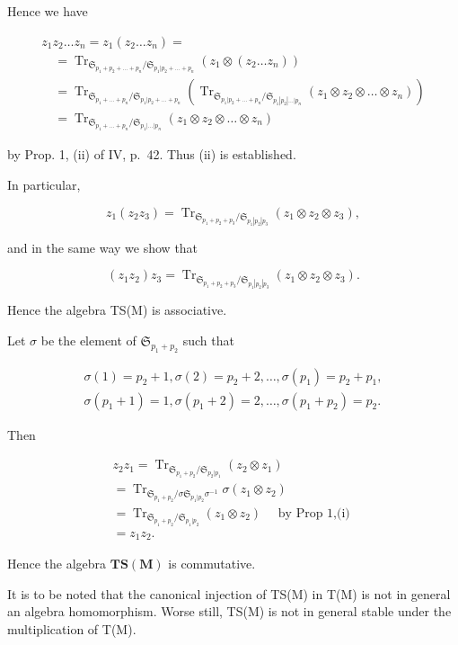 Hence we have

\[
\begin{array}{l} z _ {1} z _ {2} \dots z _ {n} = z _ {1} (z _ {2} \dots z _ {n}) = \\ \quad = \operatorname{Tr} _ {\mathfrak {S} _ {p _ {1} + p _ {2} + \dots + p _ {n}} / \mathfrak {S} _ {p _ {1} | p _ {2} + \dots + p _ {n}}} (z _ {1} \otimes (z _ {2} \dots z _ {n})) \\ \quad = \operatorname{Tr} _ {\mathfrak {S} _ {p _ {1} + \dots + p _ {n}} / \mathfrak {S} _ {p _ {1} | p _ {2} + \dots + p _ {n}}} (\operatorname{Tr} _ {\mathfrak {S} _ {p _ {1} | p _ {2} + \dots + p _ {n}} / \mathfrak {S} _ {p _ {1} | p _ {2} | \dots | p _ {n}}} (z _ {1} \otimes z _ {2} \otimes \dots \otimes z _ {n})) \\ \quad = \operatorname{Tr} _ {\mathfrak {S} _ {p _ {1} + \dots + p _ {n}} / \mathfrak {S} _ {p _ {1} | \dots | p _ {n}}} (z _ {1} \otimes z _ {2} \otimes \dots \otimes z _ {n}) \end{array}
\]

by Prop. 1, (ii) of IV, p.~42. Thus (ii) is established.

In particular,

\[
z _ {1} \left(z _ {2} z _ {3}\right) = \operatorname{Tr} _ {\mathfrak {S} _ {p _ {1} + p _ {2} + p _ {3}} / \mathfrak {S} _ {p _ {1} | p _ {2} | p _ {3}}} \left(z _ {1} \otimes z _ {2} \otimes z _ {3}\right),
\]

and in the same way we show that

\[
\left(z _ {1} z _ {2}\right) z _ {3} = \operatorname{Tr} _ {\mathfrak {S} _ {p _ {1} + p _ {2} + p _ {3}} / \mathfrak {S} _ {p _ {1} | p _ {2} | p _ {3}}} \left(z _ {1} \otimes z _ {2} \otimes z _ {3}\right).
\]

Hence the algebra TS(M) is associative.

Let \(\sigma\) be the element of \(\mathfrak{S}_{p_1 + p_2}\) such that

\[
\begin{array}{l} \sigma (1) = p _ {2} + 1, \sigma (2) = p _ {2} + 2, \dots , \sigma (p _ {1}) = p _ {2} + p _ {1}, \\ \sigma (p _ {1} + 1) = 1, \sigma (p _ {1} + 2) = 2, \dots , \sigma (p _ {1} + p _ {2}) = p _ {2}. \end{array}
\]

Then

\[
\begin{array}{l} z _ {2} z _ {1} = \operatorname{Tr} _ {\mathfrak {S} _ {p _ {1} + p _ {2}} / \mathfrak {S} _ {p _ {2} | p _ {1}}} (z _ {2} \otimes z _ {1}) \\ = \operatorname{Tr} _ {\mathfrak {S} _ {p _ {1} + p _ {2}} / \sigma \mathfrak {S} _ {p _ {1} | p _ {2}} \sigma^ {- 1}} \sigma (z _ {1} \otimes z _ {2}) \\ = \operatorname{Tr} _ {\mathfrak {S} _ {p _ {1} + p _ {2}} / \mathfrak {S} _ {p _ {1} | p _ {2}}} (z _ {1} \otimes z _ {2}) \quad \text { by   Prop   1,(i) } \\ = z _ {1} z _ {2}. \end{array}
\]

Hence the algebra \(\mathbf{TS}(\mathbf{M})\) is commutative.

It is to be noted that the canonical injection of TS(M) in T(M) is not in general an algebra homomorphism. Worse still, TS(M) is not in general stable under the multiplication of T(M).

